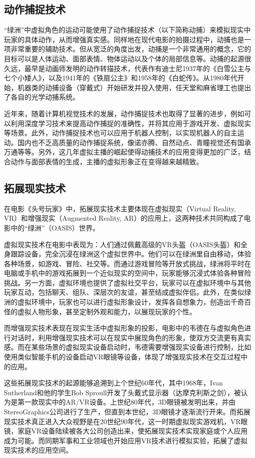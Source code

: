 \subsection{动作捕捉技术}

“绿洲”中虚拟角色的运动可能使用了动作捕捉技术（以下简称动捕）来模拟现实中玩家的具体动作，从而增强真实感。同样地在现代电影的拍摄过程中，动捕也是一项非常重要的辅助技术。但从宽泛的角度出发，动捕是一个非常通用的概念，它的目标可以是人体运动、面部表情、物体运动以及个体的局部信息等。动捕的起源很久远，最早是动画师发明的动作转描技术，代表作有迪士尼1937年的《白雪公主与七个小矮人》，以及1941年的《铁扇公主》和1958年的《白蛇传》。从1980年代开始，机器类的动捕设备（穿戴式）开始研发并投入使用，任天堂和麻省理工也提出了各自的光学动捕系统。

近年来，随着计算机视觉技术的发展，动作捕捉技术也取得了显著的进步，例如可以利用深度学习技术来提高动作捕捉的准确性，并将其应用于游戏开发、虚拟现实等场景。此外，动作捕捉技术也可以应用于机器人控制，以实现机器人的自主运动。国内也不乏高质量的动作捕捉系统，像诺亦腾、自然动点、青瞳视觉还有国承万通等等。另外，这几年虚拟主播的崛起使得动捕技术的应用变得更加的广泛，结合动作与面部表情的生成，主播的虚拟形象正在变得越来越精致。

\subsection{拓展现实技术}
在电影《头号玩家》中，拓展现实技术主要体现在虚拟现实（Virtual Reality, VR）和增强现实（Augmented Reality, AR）的应用上，这两种技术共同构成了电影中的“绿洲”（OASIS）世界。

虚拟现实技术在电影中表现为：人们通过佩戴高级的VR头盔（OASIS头盔）和全身跟踪设备，完全沉浸在绿洲这个虚拟世界中。他们可以在绿洲里自由移动，体验各种场景，如游戏、冒险、社交等。而通过游戏冒险等开放式挑战，绿洲将平时在电脑或手机中的游戏拓展到一个近似现实的空间中，玩家能够沉浸式体验各种冒险挑战。另一方面，虚拟环境也提供了虚拟社交平台，玩家可以在虚拟环境中与其他玩家互动，包括聊天、组队、深层次的友谊，甚至结成虚拟伴侣。此外，在类似绿洲的虚拟环境中，玩家也可以进行虚拟形象设计，发挥各自想象力，创造出千奇百怪的虚拟人物形象，甚至定制外观和能力，以展现玩家的个性。

而增强现实技术表现在现实生活中虚拟形象的投影，电影中的韦德在与虚拟角色进行对话时，利用增强现实技术可以在现实中展现角色的形象，使双方交流更有真实感。而在某些场景的虚拟现实设备启动时，韦德需要增强现实设备进行控制，比如使用类似智能手机的设备启动VR眼镜等设备，体现了增强现实技术在交互过程中的应用。

这些拓展现实技术的起源能够追溯到上个世纪60年代，其中1968年，Ivan Sutherland和他的学生Bob Sproull开发了头戴式显示器（达摩克利斯之剑），被认为是第一款现实中的AR/VR设备。上世纪80年代，3D眼镜被发明出来，并由StereoGraphics公司进行了生产，但直到本世纪，3D眼镜才逐渐流行开来。而拓展现实技术真正进入大众视野是在20世纪90年代，这一时期虚拟现实游戏机，VR眼镜，家庭VR设备陆续被各大公司创造出来，使拓展现实技术实现家庭或个人应用成为可能。而同期军事和工业领域也开始应用VR技术进行模拟实验，拓展了虚拟现实技术的应用空间。

